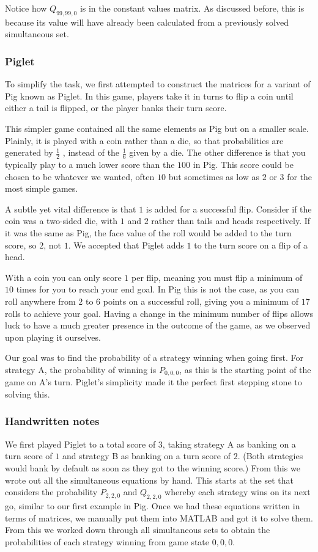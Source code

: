 \documentclass[a4paper,titlepage]{article}
\begin{document}
Notice how $Q_{99,99,0}$ is in the constant values matrix. As discussed before, this is because its value will have already been calculated from a previously solved simultaneous set.

\subsubsection{Piglet}
To simplify the task, we first attempted to construct the matrices for a variant of Pig known as Piglet. In this game, players take it in turns to flip a coin until either a tail is flipped, or the player banks their turn score.

This simpler game contained all the same elements as Pig but on a smaller scale. Plainly, it is played with a coin rather than a die, so that probabilities are generated by $\frac{1}{2}$ , instead of the $\frac{1}{6}$ given by a die. The other difference is that you typically play to a much lower score than the $100$ in Pig. This score could be chosen to be whatever we wanted, often $10$ but sometimes as low as $2$ or $3$ for the most simple games.

A subtle yet vital difference is that $1$ is added for a successful flip. Consider if the coin was a two-sided die, with $1$ and $2$ rather than tails and heads respectively. If it was the same as Pig, the face value of the roll would be added to the turn score, so $2$, not $1$.  We accepted that Piglet adds $1$ to the turn score on a flip of a head.

With a coin you can only score $1$ per flip, meaning you must flip a minimum of $10$ times for you to reach your end goal. In Pig this is not the case, as you can roll anywhere from $2$ to $6$ points on a successful roll, giving you a minimum of $17$ rolls to achieve your goal. Having a change in the minimum number of flips allows luck to have a much greater presence in the outcome of the game, as we observed upon playing it ourselves.

Our goal was to find the probability of a strategy winning when going first. For strategy A, the probability of winning is $P_{0,0,0}$, as this is the starting point of the game on A's turn. Piglet's simplicity made it the perfect first stepping stone to solving this.

\subsubsection{Handwritten notes}
We first played Piglet to a total score of $3$, taking strategy A as banking on a turn score of $1$ and strategy B as banking on a turn score of $2$. (Both strategies would bank by default as soon as they got to the winning score.) From this we wrote out all the simultaneous equations by hand. This starts at the set that considers the probability $P_{2,2,0}$ and $Q_{2,2,0}$ whereby each strategy wins on its next go, similar to our first example in Pig. Once we had these equations written in terms of matrices, we manually put them into MATLAB and got it to solve them. From this we worked down through all simultaneous sets to obtain the probabilities of each strategy winning from game state $0,0,0$.
\end{document}
